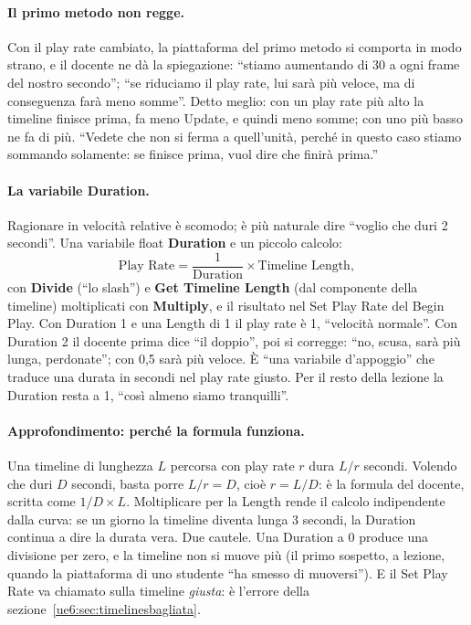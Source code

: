 \paragraph{Il primo metodo non regge.} Con il play rate cambiato, la piattaforma del primo
metodo si comporta in modo strano, e il docente ne dà la spiegazione: ``stiamo
aumentando di 30 a ogni frame del nostro secondo''; ``se riduciamo il play rate, lui
sarà più veloce, ma di conseguenza farà meno somme''. Detto meglio: con un play rate più
alto la timeline finisce prima, fa meno Update, e quindi meno somme; con uno più basso ne
fa di più. ``Vedete che non si ferma a quell'unità, perché in questo caso stiamo sommando
solamente: se finisce prima, vuol dire che finirà prima.''

\paragraph{La variabile Duration.} Ragionare in velocità relative è scomodo; è più
naturale dire ``voglio che duri 2 secondi''. Una variabile float \textbf{Duration} e un
piccolo calcolo:
\[
  \text{Play Rate} = \frac{1}{\text{Duration}} \times \text{Timeline Length},
\]
con \textbf{Divide} (``lo slash'') e \textbf{Get Timeline Length} (dal componente della
timeline) moltiplicati con \textbf{Multiply}, e il risultato nel Set Play Rate del Begin
Play. Con Duration 1 e una Length di 1 il play rate è 1, ``velocità normale''. Con
Duration 2 il docente prima dice ``il doppio'', poi si corregge: ``no, scusa, sarà più
lunga, perdonate''; con 0,5 sarà più veloce. È ``una variabile d'appoggio'' che traduce
una durata in secondi nel play rate giusto. Per il resto della lezione la Duration resta
a 1, ``così almeno siamo tranquilli''.

\paragraph{Approfondimento: perché la formula funziona.} Una timeline di lunghezza $L$
percorsa con play rate $r$ dura $L / r$ secondi. Volendo che duri $D$ secondi, basta
porre $L / r = D$, cioè $r = L / D$: è la formula del docente, scritta come $1/D \times
L$. Moltiplicare per la Length rende il calcolo indipendente dalla curva: se un giorno la
timeline diventa lunga 3 secondi, la Duration continua a dire la durata vera. Due
cautele. Una Duration a 0 produce una divisione per zero, e la timeline non si muove più
(il primo sospetto, a lezione, quando la piattaforma di uno studente ``ha smesso di
muoversi''). E il Set Play Rate va chiamato sulla timeline \emph{giusta}: è l'errore
della sezione~\ref{ue6:sec:timelinesbagliata}.

